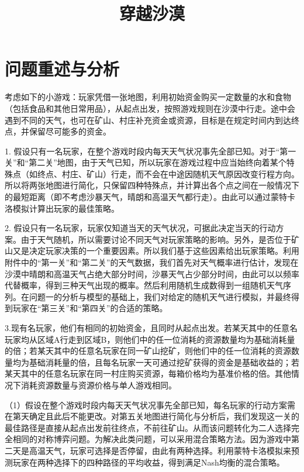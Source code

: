 \documentclass[withoutpre]{cumcmthesis} %
\title{穿越沙漠}
\begin{document}
 \maketitle
 \begin{abstract}


\end{abstract}


\section{问题重述与分析}
考虑如下的小游戏：玩家凭借一张地图，利用初始资金购买一定数量的水和食物（包括食品和其他日常用品），从起点出发，按照游戏规则在沙漠中行走。途中会遇到不同的天气，也可在矿山、村庄补充资金或资源，目标是在规定时间内到达终点，并保留尽可能多的资金。

1. 假设只有一名玩家，在整个游戏时段内每天天气状况事先全部已知。对于“第一关”和“第二关”地图，由于天气已知，所以玩家在游戏过程中应当始终向着某个特殊点（如终点、村庄、矿山）行走，而不会在中途因随机天气原因改变行程方向。所以将两张地图进行简化，只保留四种特殊点，并计算出各个点之间在一般情况下的最短距离（即不考虑沙暴天气，晴朗和高温天气都行走）。由此可以通过蒙特卡洛模拟计算出玩家的最佳策略。

2. 假设只有一名玩家，玩家仅知道当天的天气状况，可据此决定当天的行动方案。由于天气随机，所以需要讨论不同天气对玩家策略的影响。另外，是否位于矿山又是决定玩家决策的一个重要因素。所以我们基于这些因素给出玩家策略。利用附件中的“第一关”和“第二关”的天气数据，我们首先对天气概率进行估计，发现在沙漠中晴朗和高温天气占绝大部分时间，沙暴天气占少部分时间，由此可以以频率代替概率，得到三种天气出现的概率。然后利用随机生成数得到一组随机天气序列。在问题一的分析与模型的基础上，我们对给定的随机天气进行模拟，并最终得到玩家在“第三关”和“第四关”的合适的策略。

3.现有名玩家，他们有相同的初始资金，且同时从起点出发。若某天其中的任意名玩家均从区域A行走到区域B，则他们中的任一位消耗的资源数量均为基础消耗量的倍；若某天其中的任意名玩家在同一矿山挖矿，则他们中的任一位消耗的资源数量均为基础消耗量的倍，且每名玩家一天可通过挖矿获得的资金是基础收益的；若某天其中的任意名玩家在同一村庄购买资源，每箱价格均为基准价格的倍。其他情况下消耗资源数量与资源价格与单人游戏相同。

（1）假设在整个游戏时段内每天天气状况事先全部已知，每名玩家的行动方案需在第天确定且此后不能更改。对第五关地图进行简化与分析后，我们发现这一关的最佳路径是直接从起点出发前往终点，不前往矿山。从而该问题转化为二人选择完全相同的对称博弈问题。为解决此类问题，可以采用混合策略方法。因为游戏中第二天是高温天气，玩家可选择是否停留，由此有两种选择。利用蒙特卡洛模拟来预测玩家在两种选择下的四种路径的平均收益，得到满足Nash均衡的混合策略。
\end{document}
